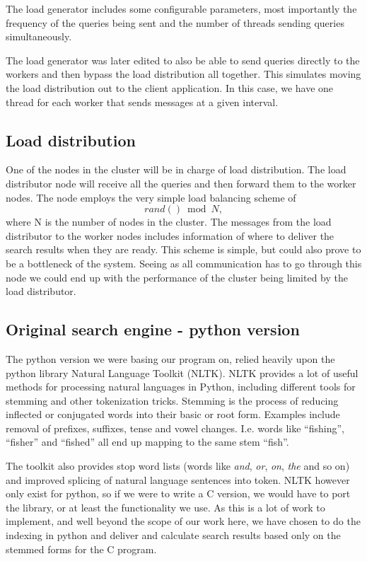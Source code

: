 The load generator includes some configurable parameters, most importantly the frequency of the queries being sent and the number of threads sending queries simultaneously.

The load generator was later edited to also be able to send queries directly to the workers and then bypass the load distribution all together. This simulates moving the load distribution out to the client application. In this case, we have one thread for each worker that sends messages at a given interval.

\subsection{Load distribution}
One of the nodes in the cluster will be in charge of load distribution. The load distributor node will receive all the queries and then forward them to the worker nodes.
The node employs the very simple load balancing scheme of $$rand() \bmod N,$$ where N is the number of nodes in the cluster.
The messages from the load distributor to the worker nodes includes information of where to deliver the search results when they are ready.
This scheme is simple, but could also prove to be a bottleneck of the system. Seeing as all communication has to go through this node we could end up with the performance of the cluster being limited by the load distributor.

\subsection{Original search engine - python version}
The python version we were basing our program on, relied heavily upon the python library Natural Language Toolkit\cite{nltk} (NLTK).
NLTK provides a lot of useful methods for processing natural languages in Python, including different tools for stemming and other tokenization tricks.
Stemming is the process of reducing inflected or conjugated words into their basic or root form. Examples include removal of prefixes, suffixes, tense and vowel changes. I.e. words like ``fishing'', ``fisher'' and ``fished'' all end up mapping to the same stem ``fish''.

The toolkit also provides stop word lists (words like {\em and}, {\em or}, {\em on}, {\em the} and so on) and improved splicing of natural language sentences into token.
NLTK however only exist for python, so if we were to write a C version, we would have to port the library, or at least the functionality we use.
As this is a lot of work to implement, and well beyond the scope of our work here, we have chosen to do the indexing in python and deliver and calculate search results based only on the stemmed forms for the C program.

